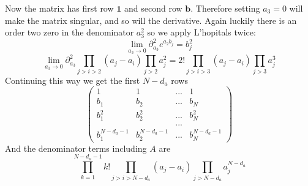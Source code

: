 \documentclass{article}
\renewcommand{\vec}{\bm}
\begin{document}
Now the matrix has first row $\vec{1}$ and second row $\vec{b}$. Therefore setting $a_{3} = 0$ will make the matrix singular, and so will the derivative. Again luckily there is an order two zero in the denominator $a_{3}^{2}$ so we apply L'hopitals twice:
\[ \lim_{a_{3} \to 0} \partial_{a_{3}}^{2} e^{a_{2} b_{j}} = b_{j}^{2}     \]
\[ \lim_{a_{3} \to 0} \partial_{a_{3}}^{2} \prod_{j > i > 2} (a_{j} - a_{i}) \prod_{j > 2} a_{j}^{2} = 2! \prod_{j > i > 3} (a_{j} - a_{i}) \prod_{j > 3} a_{j}^{3}    \]
Continuing this way we get the first $N-d_{a}$ rows 
\[ \begin{pmatrix} 1 & 1 & ... & 1
\\ b_{1} & b_{2} & ... & b_{N}
\\ b_{1}^{2} & b_{2}^{2} & ... & b_{N}^{2}
\\ & & ... & 
\\ b_{1}^{N-d_{a}-1} & b_{2}^{N-d_{a}-1} & ... & b_{N}^{N-d_{a} - 1}
\end{pmatrix}        \]
And the denominator terms including $A$ are 
\[ \prod_{k=1}^{N-d_{a}-1} k! \prod_{j > i > N-d_{a}} (a_{j} - a_{i}) \prod_{j > N-d_{a}} a_{j}^{N-d_{a}}     \]
\end{document}
